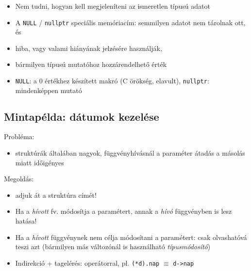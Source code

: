 \documentclass[usenames,dvipsnames,aspectratio=169]{beamer}
\begin{document}
\begin{frame}
  \begin{itemize}
    \small
    \item Nem tudni, hogyan kell megjeleníteni az ismeretlen típusú adatot
  \end{itemize}
  \begin{alertblock}{}
    \vspace{-.2cm}
    \small
    
    \vspace{-.2cm}
  \end{alertblock}
  \begin{itemize}
    \small
    \item A \texttt{NULL} / \texttt{nullptr} speciális memóriacím: semmilyen adatot nem tárolnak ott, és
    \item hiba, vagy valami hiányának jelzésére használják,
    \item bármilyen típusú mutatóhoz hozzárendelhető érték
    \item \texttt{NULL}: a 0 értékhez készített makró (C örökség, elavult), \texttt{nullptr}: mindenképpen mutató
  \end{itemize}
  \begin{exampleblock}{}
    \vspace{-.2cm}
    \footnotesize
    
    \vspace{-.2cm}
  \end{exampleblock}
\end{frame}

\subsection{Mintapélda: dátumok kezelése}
\begin{frame}
  Probléma:
  \begin{itemize}
    \item[] struktúrák általában nagyok, függvényhívásnál a paraméter átadás a másolás miatt időigényes
  \end{itemize}
  \vfill
  Megoldás:
  \begin{itemize}
    \item adjuk át a struktúra címét!
    \item {} Ha a \emph{hívott} fv. módosítja a paramétert, annak a \emph{hívó} függvényben is lesz hatása!
    \item Ha a \emph{hívott} függvénynek nem célja módosítani a paramétert:  csak olvashatóvá teszi azt
(bármilyen más változónál is használható \emph{típusmódosító})
    \item Indirekció + tagelérés: \kiemel{\texttt{->}} operátorral, pl. \texttt{(*d).nap} $\equiv$ \texttt{d->nap}
  \end{itemize}
\end{frame}
\end{document}
